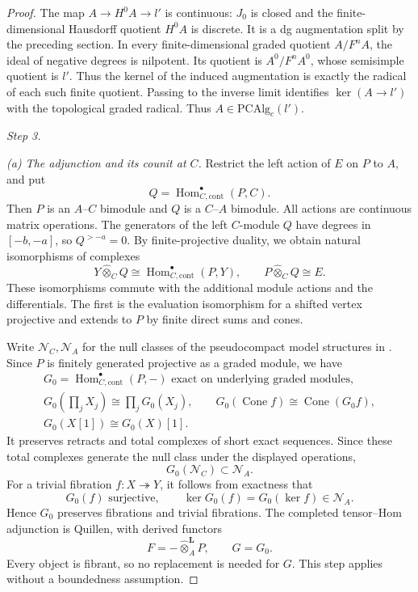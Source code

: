 \documentclass[12pt,a4paper,english,reqno]{amsart}
\theoremstyle{plain}
\theoremstyle{definition}
\numberwithin{equation}{section}
\def\Hom{\operatorname{Hom}}
\def\iso{\cong}
\def\ox{\otimes}
\def\Cone{\operatorname{Cone}}
\begin{document}
\begin{proof}
The map $A\to H^0A\to l'$ is continuous: $J_0$ is closed and the finite-dimensional Hausdorff quotient $H^0A$ is discrete. It is a dg augmentation split by the preceding section. In every finite-dimensional graded quotient $A/F^nA$, the ideal of negative degrees is nilpotent. Its quotient is $A^0/F^nA^0$, whose semisimple quotient is $l'$. Thus the kernel of the induced augmentation is exactly the radical of each such finite quotient. Passing to the inverse limit identifies $\ker(A\to l')$ with the topological graded radical. Thus $A\in\mathrm{PCAlg}_c(l')$.

\medskip\noindent\emph{Step 3.}

\smallskip\noindent\emph{(a) The adjunction and its counit at $C$.}
Restrict the left action of $E$ on $P$ to $A$, and put
\[
 Q=\Hom^\bullet_{C,\mathrm{cont}}(P,C).
\]
Then $P$ is an $A$--$C$ bimodule and $Q$ is a $C$--$A$ bimodule. All actions are continuous matrix operations. The generators of the left $C$-module $Q$ have degrees in $[-b,-a]$, so $Q^{>-a}=0$. By finite-projective duality, we obtain natural isomorphisms of complexes
\[
 Y\widehat\ox_C Q
 \iso\Hom^\bullet_{C,\mathrm{cont}}(P,Y),\qquad
 P\widehat\ox_C Q\iso E.
\]
These isomorphisms commute with the additional module actions and the differentials. The first is the evaluation isomorphism for a shifted vertex projective and extends to $P$ by finite direct sums and cones.

Write $\mathcal N_C,\mathcal N_A$ for the null classes of the pseudocompact model structures in \cite[Section 6]{VdB}. Since $P$ is finitely generated projective as a graded module, we have
\[
 \begin{gathered}
 G_0=\Hom^\bullet_{C,\mathrm{cont}}(P,-)\text{ exact on underlying graded modules},\\
 G_0(\prod_jX_j)\iso\prod_jG_0(X_j),\qquad
 G_0(\Cone f)\iso\Cone(G_0f),\\ G_0(X[1])\iso G_0(X)[1].
 \end{gathered}
\]
It preserves retracts and total complexes of short exact sequences. Since these total complexes generate the null class under the displayed operations,
\[
 G_0(\mathcal N_C)\subset\mathcal N_A.
\]
For a trivial fibration $f:X\twoheadrightarrow Y$, it follows from exactness that
\[
 G_0(f)\text{ surjective},\qquad
 \ker G_0(f)=G_0(\ker f)\in\mathcal N_A.
\]
Hence $G_0$ preserves fibrations and trivial fibrations. The completed tensor--Hom adjunction is Quillen, with derived functors
\[
 F=-\widehat\ox_A^{\mathbf L}P,\qquad G=G_0.
\]
Every object is fibrant, so no replacement is needed for $G$. This step applies without a boundedness assumption.


\end{proof}
\end{document}
